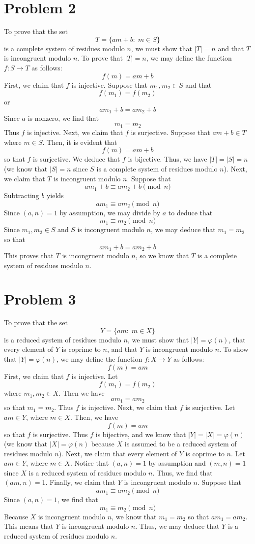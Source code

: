\documentclass[12pt]{article}
\begin{document}
\section*{Problem 2}
To prove that the set
\[
T = \{am+b: \; m \in S\}
\] is a complete system of residues modulo $n$, we must show that $\vert T \vert = n$ and that $T$ is incongruent modulo $n$. To prove that $\vert T \vert = n$, we may define the function $f: S \rightarrow T$ as follows:
\[
f(m) = am+b
\] First, we claim that $f$ is injective. Suppose that $m_1, m_2 \in S$ and that
\[
f(m_1) = f(m_2)
\] or
\[
am_1 + b = am_2 + b
\] Since $a$ is nonzero, we find that
\[
m_1 = m_2
\] Thus $f$ is injective. Next, we claim that $f$ is surjective. Suppose that $am+b \in T$ where $m \in S$. Then, it is evident that
\[
f(m) = am + b
\] so that $f$ is surjective. We deduce that $f$ is bijective. Thus, we have $\vert T \vert = \vert S \vert = n$ (we know that $\vert S \vert = n$ since $S$ is a complete system of residues modulo $n$). Next, we claim that $T$ is incongruent modulo $n$. Suppose that
\[
am_1 + b \equiv am_2 + b \pmod{n}
\] Subtracting $b$ yields
\[
am_1 \equiv am_2 \pmod{n}
\] Since $(a,n) = 1$ by assumption, we may divide by $a$ to deduce that
\[
m_1 \equiv m_2 \pmod{n}
\] Since $m_1, m_2 \in S$ and $S$ is incongruent modulo $n$, we may deduce that $m_1 = m_2$ so that
\[
am_1 + b = am_2 + b
\] This proves that $T$ is incongruent modulo $n$, so we know that $T$ is a complete system of residues modulo $n$.
\newpage
\section*{Problem 3}
To prove that the set
\[
Y = \{am: \; m \in X\}
\] is a reduced system of residues modulo $n$, we must show that $\vert Y \vert = \varphi (n)$, that every element of $Y$ is coprime to $n$, and that $Y$ is incongruent modulo $n$. To show that $\vert Y \vert = \varphi(n)$, we may define the function $f: X \rightarrow Y$ as follows:
\[
f(m) = am
\] First, we claim that $f$ is injective. Let
\[
f(m_1) = f(m_2)
\] where $m_1, m_2 \in X$. Then we have
\[
am_1 = am_2
\] so that $m_1 = m_2$. Thus $f$ is injective. Next, we claim that $f$ is surjective. Let $am \in Y$, where $m \in X$. Then, we have
\[
f(m) = am
\] so that $f$ is surjective. Thus $f$ is bijective, and we know that $\vert Y \vert = \vert X \vert = \varphi(n)$ (we know that $\vert X \vert = \varphi(n)$ because $X$ is assumed to be a reduced system of residues modulo $n$). Next, we claim that every element of $Y$ is coprime to $n$. Let $am \in Y$, where $m\in X$. Notice that $(a,n) = 1$ by assumption and $(m,n) = 1$ since $X$ is a reduced system of residues modulo $n$. Thus, we find that $(am,n) = 1$. Finally, we claim that $Y$ is incongruent modulo $n$. Suppose that
\[
am_1 \equiv am_2 \pmod{n}
\] Since $(a,n) = 1$, we find that
\[
m_1 \equiv m_2 \pmod{n}
\] Because $X$ is incongruent modulo $n$, we know that $m_1 = m_2$ so that $am_1 = am_2$. This means that $Y$ is incongruent modulo $n$. Thus, we may deduce that $Y$ is a reduced system of residues modulo $n$.
\newpage
\end{document}
